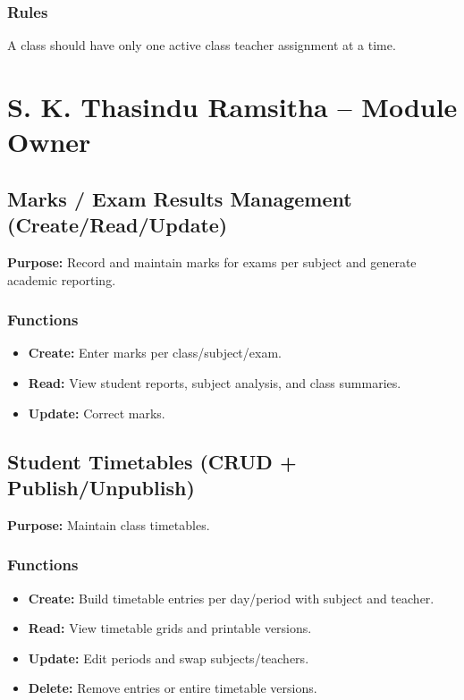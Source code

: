 \documentclass[12pt, a4paper]{report}
\begin{document}
\subsubsection*{Rules}
A class should have only one active class teacher assignment at a time.

\section{S. K. Thasindu Ramsitha -- Module Owner}

\subsection{Marks / Exam Results Management (Create/Read/Update)}
\textbf{Purpose:} Record and maintain marks for exams per subject and generate academic reporting.

\subsubsection*{Functions}
\begin{itemize}[leftmargin=*]
  \item \textbf{Create:} Enter marks per class/subject/exam.
  \item \textbf{Read:} View student reports, subject analysis, and class summaries.
  \item \textbf{Update:} Correct marks.
\end{itemize}

\subsection{Student Timetables (CRUD + Publish/Unpublish)}
\textbf{Purpose:} Maintain class timetables.

\subsubsection*{Functions}
\begin{itemize}[leftmargin=*]
  \item \textbf{Create:} Build timetable entries per day/period with subject and teacher.
  \item \textbf{Read:} View timetable grids and printable versions.
  \item \textbf{Update:} Edit periods and swap subjects/teachers.
  \item \textbf{Delete:} Remove entries or entire timetable versions.
\end{itemize}
\end{document}
